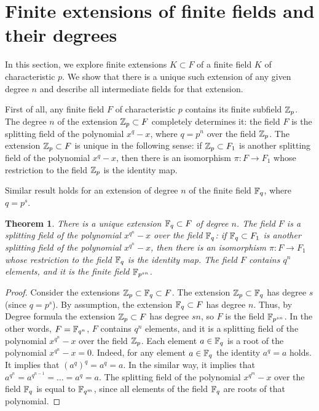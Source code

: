 \documentclass[11pt]{article}
\theoremstyle{plain}
\newtheorem{theorem}{Theorem}[section]
\theoremstyle{definition}
\begin{document}
\section{Finite extensions of finite fields and their degrees}\label{secfour}

In this section, we explore   finite extensions $K\subset F$ of a finite field $K$ of  characteristic $p$. We show that there is a unique such extension  of any given degree $n$ and describe all intermediate fields for that extension.

 First of all, any finite field $F$ of characteristic $p$ contains its finite  subfield $\Bbb Z_p$. The degree $n$ of the  extension $\Bbb Z_p\subset F$  completely determines it: the field $F$ is the splitting field of the polynomial $x^q-x$, where $q=p^n$ over the field $\Bbb Z_p$. The extension $\Bbb Z_p\subset F$ is unique in the following sense: if $\Bbb Z_p\subset F_1$ is another splitting field of the polynomial
$x^q-x$, then there is an isomorphism $\pi:F\to F_1$ whose restriction to the field $\Bbb Z_p$ is the identity map.

Similar result holds for an extension of degree $n$ of the finite field $\Bbb F_q$, where $q=p^s$.

\begin{theorem}\label{findielex}  There is a unique extension $\Bbb F_q\subset F$ of degree $n$. The field $F$ is a splitting field of the polynomial  $x^{q^n}-x$ over the field $\Bbb F_q$: if  $\Bbb F_q \subset F_1$ is another splitting field of the polynomial
$x^{q^n}-x$, then there is an isomorphism $\pi:F\to F_1$ whose restriction to the field $\Bbb F_q$ is the identity map. The field $F$ contains $q^n$ elements, and it is the finite field $\Bbb F_{p^{sn}}$.
\end{theorem}

\begin{proof} Consider the extensions $\Bbb Z_p\subset \Bbb F_q\subset F$. The extension $\Bbb Z_p\subset \Bbb F_q$ has degree $s$ (since $q=p^s$).
By assumption, the extension $\Bbb F_q\subset F$ has degree $n$. Thus, by Degree formula the extension $\Bbb Z_p\subset F$ has degree $sn$, so  $F$ is the field  $\Bbb F_{p^{sn}}$.
In the other words, $F=\Bbb F_{q^n}$, $F$ contains $q^n$ elements, and it is a splitting field of  the polynomial $x^{q^n} -x$ over the field $\Bbb Z_p$. Each element  $a\in \Bbb  F_q$ is a root of the polynomial $x^{q^n}-x=0$.
Indeed, for any element $a\in \Bbb F_q$ the identity $a^q=a$ holds. It implies that $(a^q)^q=a^q=a$. In the similar way, it implies  that $a^{q^n}= a^{q^{n-1}}=\dots =a^q=a$. The splitting field of the polynomial $x^{q^m}-x$ over the field $\Bbb F_q$ is equal to $\Bbb F_{q^m}$, since all elements of the field $\Bbb F_q$ are roots of that polynomial.
\end{proof}
\end{document}
